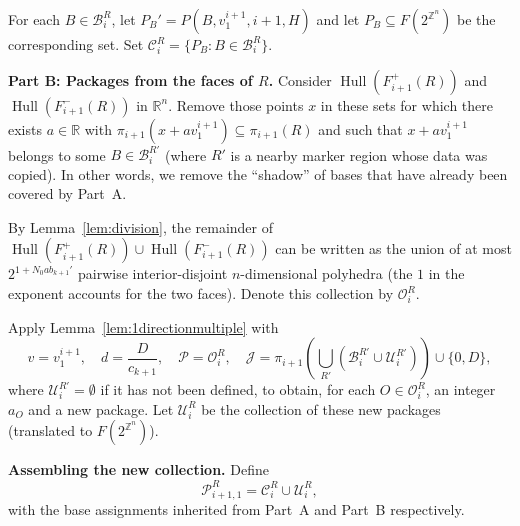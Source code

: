 \documentclass{amsart}
\theoremstyle{definition}
\DeclareMathOperator{\Hull}{Hull}
\begin{document}
For each $B\in\mathcal{B}_i^R$, let
$P_B'=P(B, v_1^{i+1}, i+1, H)$ and let $P_B\subseteq F(2^{\mathbb{Z}^n})$
be the corresponding set. Set
$\mathcal{C}_{i}^R=\{P_B\colon B\in\mathcal{B}_i^R\}$.

\medskip\noindent
\textbf{Part B: Packages from the faces of $R$.}
Consider $\Hull(F_{i+1}^+(R))$ and $\Hull(F_{i+1}^-(R))$ in
$\mathbb{R}^n$. Remove those points $x$ in these sets for which there
exists $a\in\mathbb{R}$ with
$\pi_{i+1}(x+av_1^{i+1})\subseteq\pi_{i+1}(R)$ and such that
$x+av_1^{i+1}$ belongs to some $B\in\mathcal{B}_i^{R'}$ (where $R'$ is a
nearby marker region whose data was copied). In other words, we remove
the ``shadow'' of bases that have already been covered by Part~A.

By Lemma~\ref{lem:division}, the remainder of
$\Hull(F_{i+1}^+(R))\cup\Hull(F_{i+1}^-(R))$ can be written as the
union of at most $2^{1+N_0a b_{k+1}'}$ pairwise interior-disjoint
$n$-dimensional polyhedra (the $1$ in the exponent accounts for the
two faces). Denote this collection by $\mathcal{O}_i^R$.

Apply Lemma~\ref{lem:1directionmultiple} with
\[
v=v_1^{i+1},\quad d=\frac{D}{c_{k+1}},\quad
\mathcal{P}=\mathcal{O}_i^R,\quad
\mathcal{J}=\pi_{i+1}\left (\bigcup_{R'}(\mathcal{B}_i^{R'}\cup \mathcal{U}_i^{R'})\right )
\cup\{0, D\},
\]
where $\mathcal{U}_i^{R'}=\emptyset$ if it has not been defined, 
to obtain, for each $O\in\mathcal{O}_i^R$, an integer $a_O$ and a new
package. Let $\mathcal{U}_i^R$ be the collection of these new packages
(translated to $F(2^{\mathbb{Z}^n})$).

\medskip\noindent
\textbf{Assembling the new collection.}
Define
\[
\mathcal{P}_{i+1,1}^R=\mathcal{C}_i^R\cup\mathcal{U}_i^R,
\]
with the base assignments inherited from Part~A and Part~B respectively.
\end{document}
